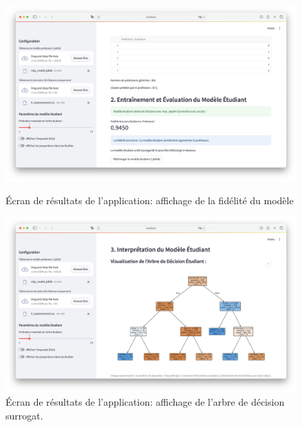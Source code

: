 \documentclass{article}
\begin{document}
\begin{figure}[h!]
    \centering
    \begin{minipage}[b]{0.48\textwidth}
        \centering
        \includegraphics[width=\textwidth]{app_fidelity.png}
        \caption{Écran de résultats de l'application: affichage de la fidélité du modèle}
        \label{fig:results_view}
    \end{minipage}
    \hfill
    \begin{minipage}[b]{0.48\textwidth}
        \centering
        \includegraphics[width=\textwidth]{app_tree.png}
        \caption{Écran de résultats de l'application: affichage de l'arbre de décision surrogat.}
        \label{fig:input_view}
    \end{minipage}
\end{figure}

\clearpage
\end{document}
